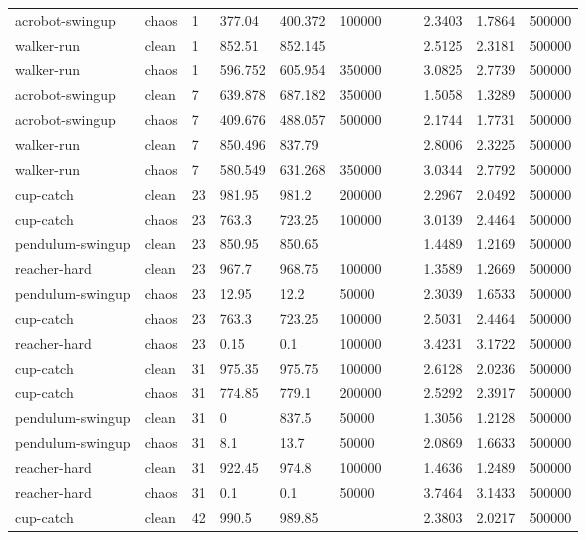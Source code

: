 \begin{tabular}{lllllllllll}
acrobot-swingup & chaos & 1 & 377.04 & 400.372 & 100000 &  &  & 2.3403 & 1.7864 & 500000 \\
walker-run & clean & 1 & 852.51 & 852.145 &  &  &  & 2.5125 & 2.3181 & 500000 \\
walker-run & chaos & 1 & 596.752 & 605.954 & 350000 &  &  & 3.0825 & 2.7739 & 500000 \\
acrobot-swingup & clean & 7 & 639.878 & 687.182 & 350000 &  &  & 1.5058 & 1.3289 & 500000 \\
acrobot-swingup & chaos & 7 & 409.676 & 488.057 & 500000 &  &  & 2.1744 & 1.7731 & 500000 \\
walker-run & clean & 7 & 850.496 & 837.79 &  &  &  & 2.8006 & 2.3225 & 500000 \\
walker-run & chaos & 7 & 580.549 & 631.268 & 350000 &  &  & 3.0344 & 2.7792 & 500000 \\
cup-catch & clean & 23 & 981.95 & 981.2 & 200000 &  &  & 2.2967 & 2.0492 & 500000 \\
cup-catch & chaos & 23 & 763.3 & 723.25 & 100000 &  &  & 3.0139 & 2.4464 & 500000 \\
pendulum-swingup & clean & 23 & 850.95 & 850.65 &  &  &  & 1.4489 & 1.2169 & 500000 \\
reacher-hard & clean & 23 & 967.7 & 968.75 & 100000 &  &  & 1.3589 & 1.2669 & 500000 \\
pendulum-swingup & chaos & 23 & 12.95 & 12.2 & 50000 &  &  & 2.3039 & 1.6533 & 500000 \\
cup-catch & chaos & 23 & 763.3 & 723.25 & 100000 &  &  & 2.5031 & 2.4464 & 500000 \\
reacher-hard & chaos & 23 & 0.15 & 0.1 & 100000 &  &  & 3.4231 & 3.1722 & 500000 \\
cup-catch & clean & 31 & 975.35 & 975.75 & 100000 &  &  & 2.6128 & 2.0236 & 500000 \\
cup-catch & chaos & 31 & 774.85 & 779.1 & 200000 &  &  & 2.5292 & 2.3917 & 500000 \\
pendulum-swingup & clean & 31 & 0 & 837.5 & 50000 &  &  & 1.3056 & 1.2128 & 500000 \\
pendulum-swingup & chaos & 31 & 8.1 & 13.7 & 50000 &  &  & 2.0869 & 1.6633 & 500000 \\
reacher-hard & clean & 31 & 922.45 & 974.8 & 100000 &  &  & 1.4636 & 1.2489 & 500000 \\
reacher-hard & chaos & 31 & 0.1 & 0.1 & 50000 &  &  & 3.7464 & 3.1433 & 500000 \\
cup-catch & clean & 42 & 990.5 & 989.85 &  &  &  & 2.3803 & 2.0217 & 500000 \\

\end{tabular}
